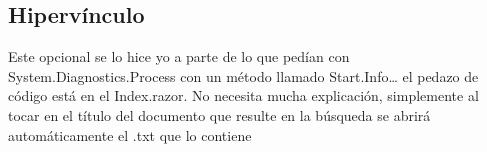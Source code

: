\documentclass[a4paper,12pt]{article}
\begin{document}
 \subsection{Hipervínculo}\label{sub:ent}
Este opcional se lo hice yo a parte de lo que pedían con System.Diagnostics.Process con un método llamado Start.Info… el pedazo de código está en el Index.razor. 
No necesita mucha explicación, simplemente al tocar en el título del documento que resulte en la búsqueda se abrirá automáticamente el .txt que lo contiene
\end{document}
